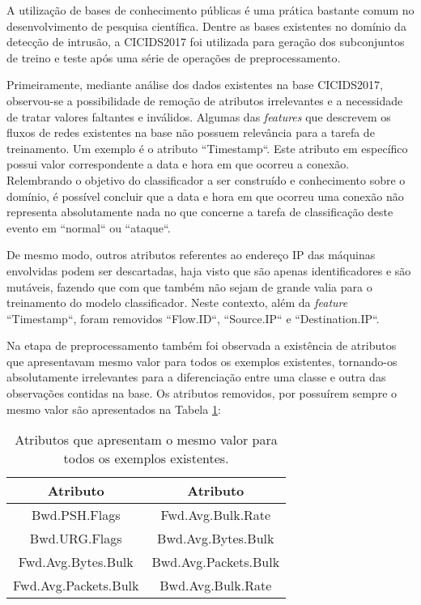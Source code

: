 A utilização de bases de conhecimento públicas é uma prática bastante comum no desenvolvimento de pesquisa científica. Dentre as bases existentes no domínio da detecção de intrusão, a CICIDS2017 foi utilizada para geração dos subconjuntos de treino e teste após uma série de operações de preprocessamento.

Primeiramente, mediante análise dos dados existentes na base CICIDS2017, observou-se a possibilidade de remoção de atributos irrelevantes e a necessidade de tratar valores faltantes e inválidos. Algumas das \textit{features} que descrevem os fluxos de redes existentes na base não possuem relevância para a tarefa de treinamento. Um exemplo é o atributo ``Timestamp``. Este atributo em específico possui valor correspondente a data e hora em que ocorreu a conexão. Relembrando o objetivo do classificador a ser construído e conhecimento sobre o domínio, é possível concluir que a data e hora em que ocorreu uma conexão não representa absolutamente nada no que concerne a tarefa de classificação deste evento em ``normal`` ou ``ataque``.

De mesmo modo, outros atributos referentes ao endereço IP das máquinas envolvidas podem ser descartadas, haja visto que são apenas identificadores e são mutáveis, fazendo que com que também não sejam de grande valia para o treinamento do modelo classificador. Neste contexto, além da \textit{feature} ``Timestamp``, foram removidos ``Flow.ID``, ``Source.IP`` e ``Destination.IP``.

Na etapa de preprocessamento também foi observada a existência de atributos que apresentavam mesmo valor para todos os exemplos existentes, tornando-os absolutamente irrelevantes para a diferenciação entre uma classe e outra das observações contidas na base. Os atributos removidos, por possuírem sempre o mesmo valor são apresentados na Tabela \ref{tab:atributos-com-mesmo-valor}:

\begin{table}[H]
    \centering
    \begin{tabular}{cc}
        \hline
        \textbf{Atributo} & \textbf{Atributo} \\
        \hline
        Bwd.PSH.Flags & Fwd.Avg.Bulk.Rate \\
        Bwd.URG.Flags & Bwd.Avg.Bytes.Bulk \\
        Fwd.Avg.Bytes.Bulk & Bwd.Avg.Packets.Bulk \\
        Fwd.Avg.Packets.Bulk & Bwd.Avg.Bulk.Rate \\
        \hline
    \end{tabular}
    \caption{Atributos que apresentam o mesmo valor para todos os exemplos existentes.}
    \label{tab:atributos-com-mesmo-valor}
\end{table}

